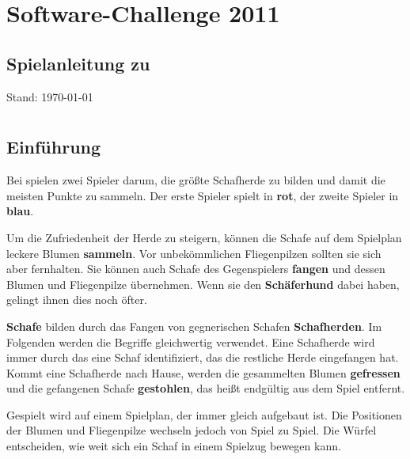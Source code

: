 \documentclass[11pt,pointlessnumbers,DIV10,BCOR10mm,tocleft]{scrreprt}
\begin{document}
\verydarkgray
\chapter*{Software-Challenge 2011}
\vspace*{-.9cm}
\section*{Spielanleitung zu }
\thispagestyle{empty}
\vspace*{-.2cm}

\vfill
Stand: \today

\pagestyle{headings}
\tableofcontents

\pagestyle{plain}
\chapter*{}
\section{Einführung}
Bei  spielen zwei Spieler darum, die größte Schafherde zu bilden und damit die meisten Punkte zu sammeln. Der erste Spieler spielt in \textbf{rot}, der zweite Spieler in \textbf{blau}.

Um die Zufriedenheit der Herde zu steigern, können die Schafe auf dem Spielplan leckere Blumen \textbf{sammeln}. Vor unbekömmlichen Fliegenpilzen sollten sie sich aber fernhalten. Sie können auch Schafe des Gegenspielers \textbf{fangen} und dessen Blumen und Fliegenpilze übernehmen. Wenn sie den \textbf{Schäferhund} dabei haben, gelingt ihnen dies noch öfter.

\textbf{Schafe} bilden durch das Fangen von gegnerischen Schafen \textbf{Schafherden}. Im Folgenden werden die Begriffe gleichwertig verwendet. Eine Schafherde wird immer durch das eine Schaf identifiziert, das die restliche Herde eingefangen hat. Kommt eine Schafherde nach Hause, werden die gesammelten Blumen \textbf{gefressen} und die gefangenen Schafe \textbf{gestohlen}, das heißt endgültig aus dem Spiel entfernt.

Gespielt wird auf einem Spielplan, der immer gleich aufgebaut ist. Die Positionen der Blumen und Fliegenpilze wechseln jedoch von Spiel zu Spiel. Die Würfel entscheiden, wie weit sich ein Schaf in einem Spielzug bewegen kann.
\end{document}
